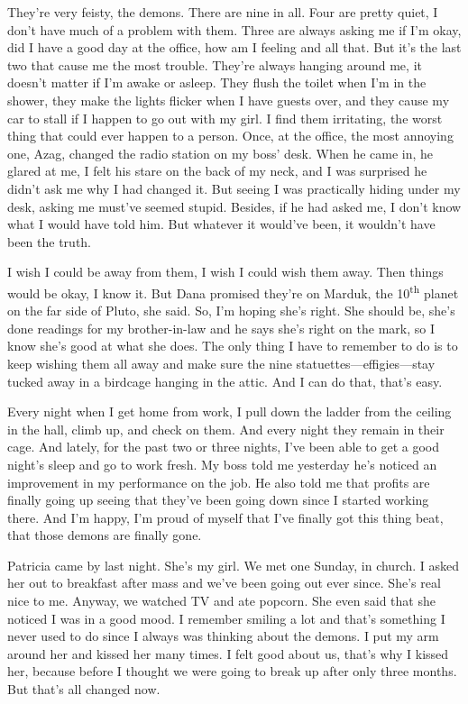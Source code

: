 They're very feisty, the demons. There are nine in all. Four are pretty
quiet, I don't have much of a problem with them. Three are always asking
me if I'm okay, did I have a good day at the office, how am I feeling
and all that. But it's the last two that cause me the most trouble.
They're always hanging around me, it doesn't matter if I'm awake or
asleep. They flush the toilet when I'm in the shower, they make the
lights flicker when I have guests over, and they cause my car to stall
if I happen to go out with my girl. I find them irritating, the worst
thing that could ever happen to a person. Once, at the office, the most
annoying one, Azag, changed the radio station on my boss' desk. When he
came in, he glared at me, I felt his stare on the back of my neck, and I
was surprised he didn't ask me why I had changed it. But seeing I was
practically hiding under my desk, asking me must've seemed stupid.
Besides, if he had asked me, I don't know what I would have told him.
But whatever it would've been, it wouldn't have been the truth.

I wish I could be away from them, I wish I could wish them away. Then
things would be okay, I know it. But Dana promised they're on Marduk,
the 10\textsuperscript{th} planet on the far side of Pluto, she said.
So, I'm hoping she's right. She should be, she's done readings for my
brother-in-law and he says she's right on the mark, so I know she's good
at what she does. The only thing I have to remember to do is to keep
wishing them all away and make sure the nine
statuettes---effigies---stay tucked away in a birdcage hanging in the
attic. And I can do that, that's easy.

Every night when I get home from work, I pull down the ladder from the
ceiling in the hall, climb up, and check on them. And every night they
remain in their cage. And lately, for the past two or three nights, I've
been able to get a good night's sleep and go to work fresh. My boss told
me yesterday he's noticed an improvement in my performance on the job.
He also told me that profits are finally going up seeing that they've
been going down since I started working there. And I'm happy, I'm proud
of myself that I've finally got this thing beat, that those demons are
finally gone.

Patricia came by last night. She's my girl. We met one Sunday, in
church. I asked her out to breakfast after mass and we've been going out
ever since. She's real nice to me. Anyway, we watched TV and ate
popcorn. She even said that she noticed I was in a good mood. I remember
smiling a lot and that's something I never used to do since I always was
thinking about the demons. I put my arm around her and kissed her many
times. I felt good about us, that's why I kissed her, because before I
thought we were going to break up after only three months. But that's
all changed now.

